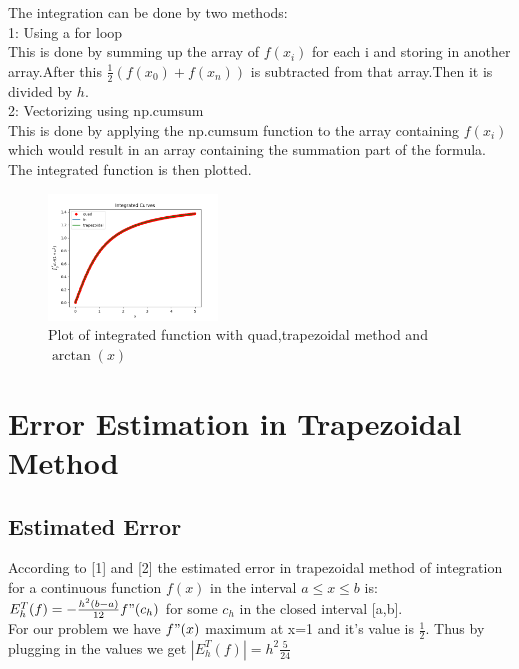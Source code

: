 \documentclass[11pt, a3paper, twocolumn]{article}
\begin{document}
The integration can be done by two methods:\\
1: Using a for loop\\
This is done by summing up the array of $f(x_i)$ for each i and storing in another array.After this $\frac{1}{2}(f(x_0)+f(x_n))$ is subtracted from that array.Then it is divided by $h$.
\\2: Vectorizing using {\selectfont np.cumsum}
\\This is done by applying the {\selectfont np.cumsum} function to the array containing $f(x_i)$ which would result in an array containing the summation part of the formula.
\\ The integrated function is then plotted.
\begin{figure}[h!]
  \includegraphics[width=0.4\textwidth, right]{Fig4.png}
  \caption{Plot of integrated function with  {\selectfont quad},trapezoidal method and $\arctan(x)$}
\end{figure}

\section{Error Estimation in Trapezoidal Method}
\subsection{Estimated Error}
According to [1] and [2] the estimated error in trapezoidal method of integration for a continuous function $f(x)$ in the interval $a \leq x \leq b$ is:\\
$ E_h^T(f)=-\frac{h^2(b-a)}{12}f"(c_h)$ for some $c_h$ in the closed interval [a,b].
\\For our problem we have $f"(x) $ maximum at x=1 and it's value is $\frac{1}{2}$.
Thus by plugging in the values we get $|E_h^T(f)|=h^2\frac{5}{24}$
\end{document}
